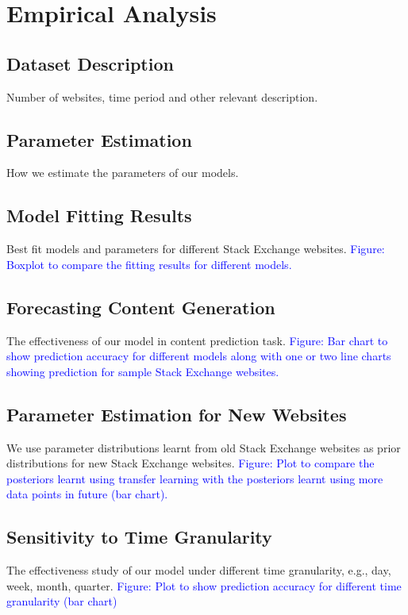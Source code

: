 \section{Empirical Analysis}

\subsection{Dataset Description} 
Number of websites, time period and other relevant description.

\subsection{Parameter Estimation} 
How we estimate the parameters of our models.

\subsection{Model Fitting Results} 
Best fit models and parameters for different Stack Exchange websites. \textcolor{blue}{Figure: Boxplot to compare the fitting results for different models.}

\subsection{Forecasting Content Generation} 
The effectiveness of our model in content prediction task. \textcolor{blue}{Figure: Bar chart to show prediction accuracy for different models along with one or two line charts showing prediction for sample Stack Exchange websites.}

\subsection{Parameter Estimation for New Websites} We use parameter distributions learnt from old Stack Exchange websites as prior distributions for new Stack Exchange websites. \textcolor{blue}{Figure: Plot to compare the posteriors learnt using transfer learning with the posteriors learnt using more data points in future (bar chart).}

\subsection{Sensitivity to Time Granularity} 
The effectiveness study of our model under different time granularity, e.g., day, week, month, quarter. \textcolor{blue}{Figure: Plot to show prediction accuracy for different time granularity (bar chart)}


